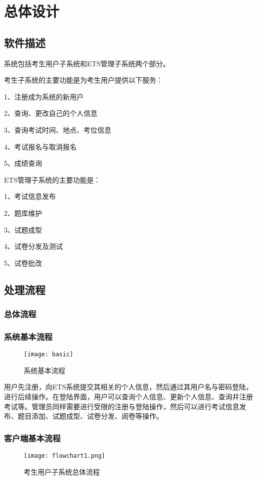 \chapter{总体设计}
\section{软件描述}
系统包括考生用户子系统和ETS管理子系统两个部分。

考生子系统的主要功能是为考生用户提供以下服务：

1、注册成为系统的新用户

2、查询、更改自己的个人信息

3、查询考试时间、地点、考位信息

4、考试报名与取消报名

5、成绩查询

ETS管理子系统的主要功能是：

1、考试信息发布

2、题库维护

3、试题成型

4、试卷分发及测试

5、试卷批改

\section{处理流程}
\subsection{总体流程}

\subsection{系统基本流程}
\begin{figure}[ht]
\centering
\texttt{[image: basic]}
\caption{系统基本流程} \label{fig:figure1}
\end{figure}

用户先注册，向ETS系统提交其相关的个人信息，然后通过其用户名与密码登陆，进行后续操作。在登陆界面，用户可以查询个人信息、更新个人信息、查询并注册考试等。管理员同样需要进行受限的注册与登陆操作，然后可以进行考试信息发布、题目添加、试题成型、试卷分发、阅卷等操作。

\subsection{客户端基本流程}
\begin{figure}[ht]
\centering
\texttt{[image: flowchart1.png]}
\caption{考生用户子系统总体流程} \label{fig:figure1}
\end{figure}

